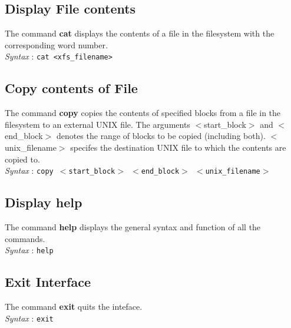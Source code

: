 \documentclass[11pt]{report}
\begin{document}
\subsection{Display File contents}
The command \textbf{cat} displays the contents of a file in the filesystem with the corresponding word number.\\
\textit{Syntax} : \texttt{cat <xfs\_filename> }

\subsection{Copy contents of File}
The command \textbf{copy} copies the contents of specified blocks from a file in the filesystem to an external UNIX file. The arguments $<$start\_block$>$ and $<$end\_block$>$ denotes the range of blocks to be copied (including both). $<$unix\_filename$>$ specifes the destination UNIX file to which the contents are copied to.\\
\textit{Syntax} : \texttt{copy $<$start\_block$>$ $<$end\_block$>$ $<$unix\_filename$>$}

\subsection{Display help}
The command \textbf{help} displays the general syntax and function of all the commands. \\
\textit{Syntax} : \texttt{help}

\subsection{Exit Interface}
The command \textbf{exit} quits the inteface.\\
\textit{Syntax} : \texttt{exit}

 
 
 
\end{document}
